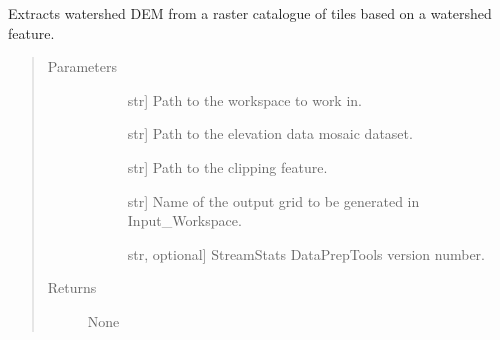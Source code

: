 \documentclass[letterpaper,10pt,english]{sphinxmanual}
\begin{document}
\begin{fulllineitems}
\label{\detokenize{elevationTools:elevationTools.extractPoly}}
Extracts watershed DEM from a raster catalogue of tiles based on a watershed feature.
\begin{quote}\begin{description}
\item[{Parameters}] \leavevmode\begin{description}
\item[{}] \leavevmode{[}str{]}
Path to the workspace to work in.

\item[{}] \leavevmode{[}str{]}
Path to the elevation data mosaic dataset.

\item[{}] \leavevmode{[}str{]}
Path to the clipping feature.

\item[{}] \leavevmode{[}str{]}
Name of the output grid to be generated in Input\_Workspace.

\item[{}] \leavevmode{[}str, optional{]}
StreamStats DataPrepTools version number.

\end{description}

\item[{Returns}] \leavevmode\begin{description}
\item[{None}] \leavevmode
\end{description}

\end{description}\end{quote}

\end{fulllineitems}

\end{document}
